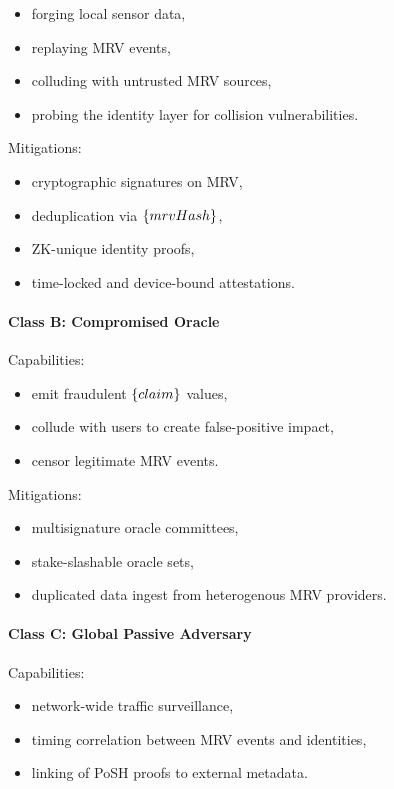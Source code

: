 \documentclass{article}
\begin{document}
\begin{itemize}
\item forging local sensor data,
\item replaying MRV events,
\item colluding with untrusted MRV sources,
\item probing the identity layer for collision vulnerabilities.
\end{itemize}

Mitigations:

\begin{itemize}
\item cryptographic signatures on MRV,
\item deduplication via $\mathsf\{mrvHash\}$,
\item ZK-unique identity proofs,
\item time-locked and device-bound attestations.
\end{itemize}

\paragraph{Class B: Compromised Oracle}

Capabilities:

\begin{itemize}
\item emit fraudulent $\mathsf\{claim\}$ values,
\item collude with users to create false-positive impact,
\item censor legitimate MRV events.
\end{itemize}

Mitigations:

\begin{itemize}
\item multisignature oracle committees,
\item stake-slashable oracle sets,
\item duplicated data ingest from heterogenous MRV providers.
\end{itemize}

\paragraph{Class C: Global Passive Adversary}

Capabilities:

\begin{itemize}
\item network-wide traffic surveillance,
\item timing correlation between MRV events and identities,
\item linking of PoSH proofs to external metadata.
\end{itemize}
\end{document}
